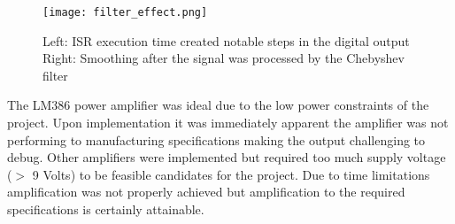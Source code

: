 \begin{figure}[h]
  \centering
  \texttt{[image: filter\_effect.png]}
  \caption{Left: ISR execution time created notable steps in the digital output 
		Right: Smoothing after the signal was processed by the Chebyshev filter}
  \label{fig:filter_effect}
\end{figure}

	The LM386 power amplifier was ideal due to the low power constraints of the project.  Upon implementation it was immediately apparent the amplifier was not performing to manufacturing specifications making the output challenging to debug. Other amplifiers were implemented but required too much supply voltage ($>$ 9 Volts) to be feasible candidates for the project.  Due to time limitations amplification was not properly achieved but amplification to the required specifications is certainly attainable. 




